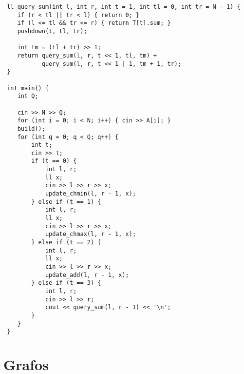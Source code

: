 \documentclass[11pt, a4paper, twoside]{article}
\begin{document}
\begin{lstlisting}
 ll query_sum(int l, int r, int t = 1, int tl = 0, int tr = N - 1) {
 	if (r < tl || tr < l) { return 0; }
 	if (l <= tl && tr <= r) { return T[t].sum; }
 	pushdown(t, tl, tr);
 
 	int tm = (tl + tr) >> 1;
 	return query_sum(l, r, t << 1, tl, tm) +
 	       query_sum(l, r, t << 1 | 1, tm + 1, tr);
 }
 
 int main() {
 	int Q;
 
 	cin >> N >> Q;
 	for (int i = 0; i < N; i++) { cin >> A[i]; }
 	build();
 	for (int q = 0; q < Q; q++) {
 		int t;
 		cin >> t;
 		if (t == 0) {
 			int l, r;
 			ll x;
 			cin >> l >> r >> x;
 			update_chmin(l, r - 1, x);
 		} else if (t == 1) {
 			int l, r;
 			ll x;
 			cin >> l >> r >> x;
 			update_chmax(l, r - 1, x);
 		} else if (t == 2) {
 			int l, r;
 			ll x;
 			cin >> l >> r >> x;
 			update_add(l, r - 1, x);
 		} else if (t == 3) {
 			int l, r;
 			cin >> l >> r;
 			cout << query_sum(l, r - 1) << '\n';
 		}
 	}
 }
\end{lstlisting}

\clearpage


%
%

\section{Grafos}
\end{document}
